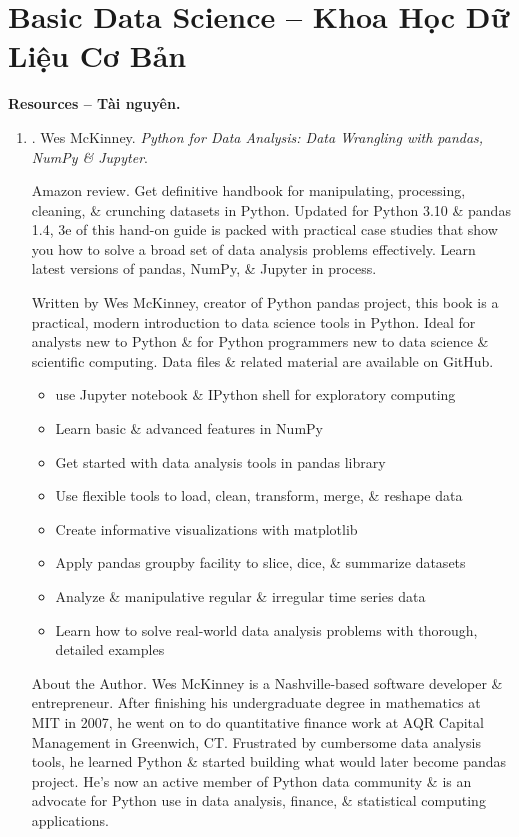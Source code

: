 \documentclass{article}
\begin{document}
\section{Basic Data Science -- Khoa Học Dữ Liệu Cơ Bản}
\textbf{\textsf{Resources -- Tài nguyên.}}
\begin{enumerate}
	\item \cite{McKinney2022}. {\sc Wes McKinney}. {\it Python for Data Analysis: Data Wrangling with pandas, NumPy \& Jupyter}. {}
	
	{\sf Amazon review.} Get definitive handbook for manipulating, processing, cleaning, \& crunching datasets in Python. Updated for Python 3.10 \& pandas 1.4, 3e of this hand-on guide is packed with practical case studies that show you how to solve a broad set of data analysis problems effectively. Learn latest versions of pandas, NumPy, \& Jupyter in process.
	
	Written by {\sc Wes McKinney}, creator of Python pandas project, this book is a practical, modern introduction to data science tools in Python. Ideal for analysts new to Python \& for Python programmers new to data science \& scientific computing. Data files \& related material are available on GitHub.
	\begin{itemize}
		\item use Jupyter notebook \& IPython shell for exploratory computing
		\item Learn basic \& advanced features in NumPy
		\item Get started with data analysis tools in pandas library
		\item Use flexible tools to load, clean, transform, merge, \& reshape data
		\item Create informative visualizations with matplotlib
		\item Apply pandas groupby facility to slice, dice, \& summarize datasets
		\item Analyze \& manipulative regular \& irregular time series data
		\item Learn how to solve real-world data analysis problems with thorough, detailed examples
	\end{itemize}
	{\sf About the Author.} {\sc Wes McKinney} is a Nashville-based software developer \& entrepreneur. After finishing his undergraduate degree in mathematics at MIT in 2007, he went on to do quantitative finance work at AQR Capital Management in Greenwich, CT. Frustrated by cumbersome data analysis tools, he learned Python \& started building what would later become pandas project. He's now an active member of Python data community \& is an advocate for Python use in data analysis, finance, \& statistical computing applications.
	

\end{enumerate}
\end{document}
